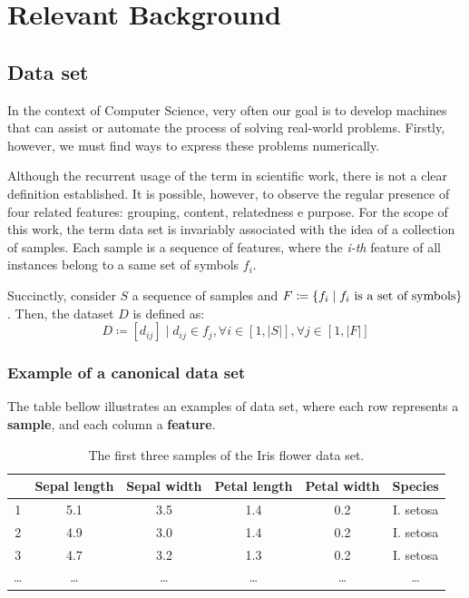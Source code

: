 \documentclass[12pt]{article}
\begin{document}
\newpage

\section{Relevant Background}
\subsection{Data set}

In the context of Computer Science, very often our goal is to develop machines that can assist or automate the process of solving real-world problems. Firstly, however, we must find ways to express these problems numerically.

Although the recurrent usage of the term in scientific work, there is not a clear definition established. It is possible, however, to observe the regular presence of four related features: grouping, content, relatedness e purpose. \cite{ren2010}
For the scope of this work, the term data set is invariably associated with the idea of a collection of samples. Each sample is a sequence of features, where the {\em i-th} feature of all instances belong to a same set of symbols $f_i$.

Succinctly, consider $S$ a sequence of samples and
$F \coloneqq  \{f_i \mid f_i \textnormal{ is a set of symbols}\}$. Then, the dataset $D$ is defined as:
$$D\coloneqq [d_{ij}] \mid d_{ij} \in f_j, \forall i \in [1, |S|], \forall j \in [1, |F|]$$

\subsubsection{Example of a canonical data set} \label{irisdataset}

The table bellow illustrates an examples of data set, where each row represents a \textbf{sample}, and each column a \textbf{feature}.

\begin{table}[H]
	\begin{tabular}{ c || *{5}{c|}}
		& \textbf{Sepal length} & \textbf{Sepal width} & \textbf{Petal length} & \textbf{Petal width} & \textbf{Species} \\
		\hline
		1 & 5.1	& 3.5 & 1.4 & 0.2 & I. setosa \\
		2 & 4.9 & 3.0 & 1.4 & 0.2 & I. setosa \\
		3 & 4.7 & 3.2 & 1.3 & 0.2 & I. setosa \\
		… & … & … & … & … & … \\
	\end{tabular}
	\caption{The first three samples of the Iris flower data set.}
\end{table}
\end{document}
